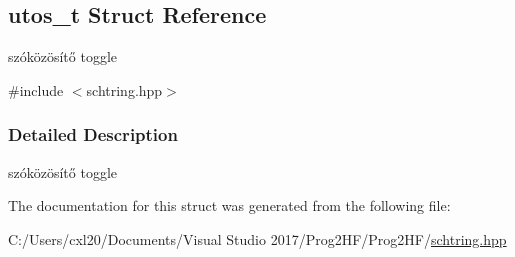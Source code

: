 \subsection{utos\+\_\+t Struct Reference}
\label{structutos__t}


szóközösítő toggle  




{\ttfamily \#include $<$schtring.\+hpp$>$}



\subsubsection{Detailed Description}
szóközösítő toggle 

The documentation for this struct was generated from the following file\+:\begin{DoxyCompactItemize}
\item 
C\+:/\+Users/cxl20/\+Documents/\+Visual Studio 2017/\+Prog2\+H\+F/\+Prog2\+H\+F/\mbox{\hyperlink{schtring_8hpp}{schtring.\+hpp}}\end{DoxyCompactItemize}
